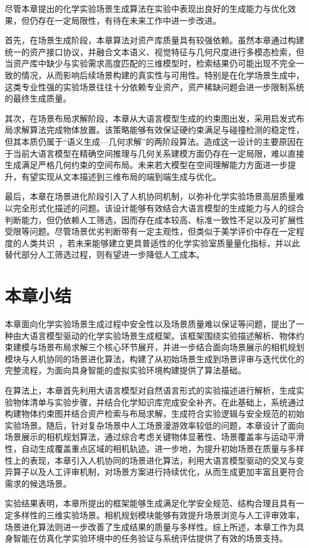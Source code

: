 尽管本章提出的化学实验场景生成算法在实验中表现出良好的生成能力与优化效果，但仍存在一定局限性，有待在未来工作中进一步改进。

首先，在场景生成阶段，本章算法对资产库质量具有较强依赖。虽然本章通过构建统一的资产接口协议，并融合文本语义、视觉特征与几何尺度进行多模态检索，但当资产库中缺少与实验需求高度匹配的三维模型时，检索结果仍可能出现不完全一致的情况，从而影响后续场景构建的真实性与可用性。特别是在化学场景生成中，这类专业性强的实验场景往往十分依赖专业资产，资产稀缺问题会进一步限制系统的最终生成质量。

其次，在场景布局求解阶段，本章从大语言模型生成的约束图出发，采用启发式布局求解算法完成物体放置。该策略能够有效保证硬约束满足与碰撞检测的稳定性，但其本质仍属于“语义生成—几何求解”的两阶段算法。造成这一设计的主要原因在于当前大语言模型在精确空间推理与几何关系建模方面仍存在一定局限，难以直接生成满足严格几何约束的空间布局。未来若大模型在空间理解能力方面进一步提升，有望实现从文本描述到三维布局的端到端生成与优化。

最后，本章在场景进化阶段引入了人机协同机制，以弥补化学实验场景高层质量难以完全形式化描述的问题。该设计能够有效结合大语言模型的生成能力与人的综合判断能力，但仍依赖人工筛选，因而存在成本较高、标准一致性不足以及可扩展性受限等问题。尽管场景优劣判断带有一定主观性，但类似于美学评价中存在一定程度的人类共识~\cite{murray2012ava,vessel2018shared,kim2020objectivity}，若未来能够建立更具普适性的化学实验室质量量化指标，并以此替代部分人工筛选过程，则有望进一步降低人工成本。



\section{本章小结}

本章面向化学实验场景生成过程中安全性以及场景质量难以保证等问题，提出了一种由大语言模型驱动的化学实验场景生成框架。该框架围绕实验描述解析、物体约束建模与场景布局求解三个核心环节展开，并进一步结合面向场景展示的相机规划模块与人机协同的场景进化算法，构建了从初始场景生成到场景评审与迭代优化的完整流程，为面向具身智能的虚拟实验环境构建提供了算法基础。

在算法上，本章首先利用大语言模型对自然语言形式的实验描述进行解析，生成实验物体清单与实验步骤，并结合化学知识库完成安全补齐。在此基础上，系统通过构建物体约束图并结合资产检索与布局求解，生成符合实验逻辑与安全规范的初始实验场景。随后，针对复杂场景中人工场景漫游效率较低的问题，本章设计了面向场景展示的相机规划算法，通过综合考虑关键物体显著性、场景覆盖率与运动平滑性，自动生成覆盖重点区域的相机轨迹。进一步地，为提升初始场景在质量与多样性上的表现，本章引入人机协同的场景进化算法，利用大语言模型驱动的交叉与变异算子以及人工评审机制，对场景方案进行持续优化，从而生成更加丰富且更符合需求的候选场景。

实验结果表明，本章所提出的框架能够生成满足化学安全规范、结构合理且具有一定多样性的三维实验场景。相机规划模块能够有效提升场景浏览与人工评审效率，场景进化算法则进一步改善了生成结果的质量与多样性。综上所述，本章工作为具身智能在仿真化学实验环境中的任务验证与系统评估提供了有效的场景支持。
